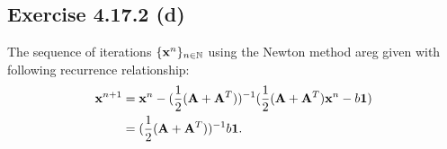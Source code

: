 \documentclass{exam}
\begin{document}
\subsection*{Exercise 4.17.2 (d)}
The sequence of iterations $\{\bold{x}^n\}_{n \in \mathbb{N}}$ using the Newton method areg given with following recurrence 
relationship:\\
\begin{equation*}
    \begin{aligned}
        \bold{x}^{n+1} &= \bold{x}^{n} - \displaystyle (\frac{1}{2}(\bold{A}  + \bold{A}^{T}))^{-1}(\frac{1}{2}(\bold{A}  + \bold{A}^{T})\bold{x}^{n} - b\boldsymbol{1})\\
        &= \displaystyle (\frac{1}{2}(\bold{A}  + \bold{A}^{T}))^{-1} b\boldsymbol{1}.
    \end{aligned}
\end{equation*}
\end{document}
